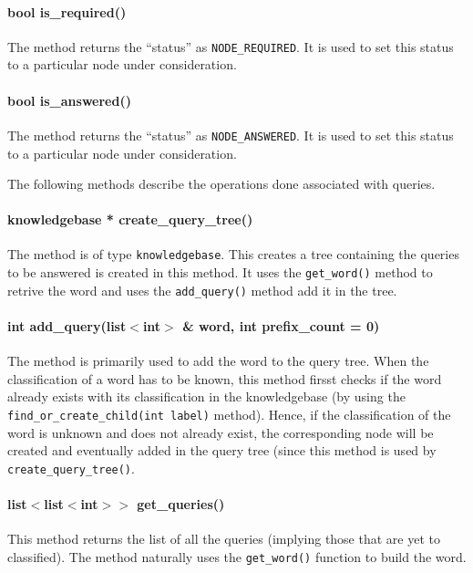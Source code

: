 \paragraph{bool is\_required()} \hfill
	The method returns the ``status'' as \texttt{NODE\_REQUIRED}. It is used to set this status to a particular node under consideration.

\paragraph{bool is\_answered()} \hfill
	The method returns the ``status'' as \texttt{NODE\_ANSWERED}. It is used to set this status to a particular node under consideration.

\vskip 2pt

  The following methods describe the operations done associated with queries.

\paragraph{knowledgebase * create\_query\_tree()} \hfill
	The method is of type \texttt{knowledgebase}. This creates a tree containing the queries to be answered is created in this method.
It uses the \texttt{get\_word()} method to retrive the word and uses the \texttt{add\_query()} method add it in the tree.

\paragraph{int add\_query(list$<$int$>$ \& word, int prefix\_count = 0)} \hfill
	The method is primarily used to add the word to the query tree. When the classification of a word has to be known, this method firsst checks if the word already exists with its classification in the knowledgebase (by using the \texttt{find\_or\_create\_child(int label)} method). Hence, if the classification of the word is unknown and does not already exist, the corresponding node will be created and eventually added in the query tree (since this method is used by \texttt{create\_query\_tree()}.
  
\paragraph{list$<$list$<$int$>$$>$ get\_queries()} \hfill
	This method returns the list of all the queries (implying those that are yet to classified). The method naturally uses the \texttt{get\_word()} function to build the word.
	
